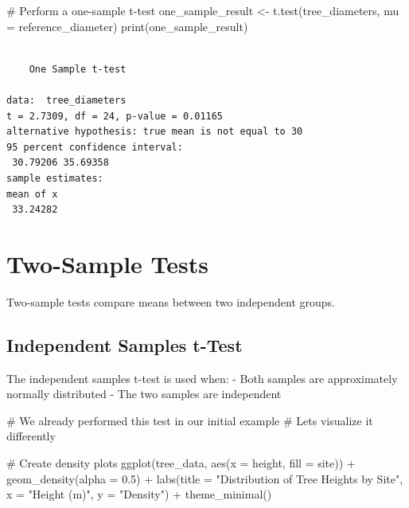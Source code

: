 \documentclass[
  letterpaper,
]{book}
\newenvironment{Shaded}{\begin{snugshade}}{\end{snugshade}}
\newcommand{\AttributeTok}[1]{\textcolor[rgb]{0.40,0.45,0.13}{#1}}
\newcommand{\CommentTok}[1]{\textcolor[rgb]{0.37,0.37,0.37}{#1}}
\newcommand{\FloatTok}[1]{\textcolor[rgb]{0.68,0.00,0.00}{#1}}
\newcommand{\FunctionTok}[1]{\textcolor[rgb]{0.28,0.35,0.67}{#1}}
\newcommand{\NormalTok}[1]{\textcolor[rgb]{0.00,0.23,0.31}{#1}}
\newcommand{\OtherTok}[1]{\textcolor[rgb]{0.00,0.23,0.31}{#1}}
\newcommand{\SpecialCharTok}[1]{\textcolor[rgb]{0.37,0.37,0.37}{#1}}
\newcommand{\StringTok}[1]{\textcolor[rgb]{0.13,0.47,0.30}{#1}}
\begin{document}
\begin{Shaded}
\begin{Highlighting}[]
\CommentTok{\# Perform a one{-}sample t{-}test}
\NormalTok{one\_sample\_result }\OtherTok{\textless{}{-}} \FunctionTok{t.test}\NormalTok{(tree\_diameters, }\AttributeTok{mu =}\NormalTok{ reference\_diameter)}
\FunctionTok{print}\NormalTok{(one\_sample\_result)}
\end{Highlighting}
\end{Shaded}

\begin{verbatim}

    One Sample t-test

data:  tree_diameters
t = 2.7309, df = 24, p-value = 0.01165
alternative hypothesis: true mean is not equal to 30
95 percent confidence interval:
 30.79206 35.69358
sample estimates:
mean of x 
 33.24282 
\end{verbatim}

\section{Two-Sample Tests}\label{two-sample-tests}

Two-sample tests compare means between two independent groups.

\subsection{Independent Samples
t-Test}\label{independent-samples-t-test}

The independent samples t-test is used when: - Both samples are
approximately normally distributed - The two samples are independent

\begin{Shaded}
\begin{Highlighting}[]
\CommentTok{\# We already performed this test in our initial example}
\CommentTok{\# Let\textquotesingle{}s visualize it differently}

\CommentTok{\# Create density plots}
\FunctionTok{ggplot}\NormalTok{(tree\_data, }\FunctionTok{aes}\NormalTok{(}\AttributeTok{x =}\NormalTok{ height, }\AttributeTok{fill =}\NormalTok{ site)) }\SpecialCharTok{+}
  \FunctionTok{geom\_density}\NormalTok{(}\AttributeTok{alpha =} \FloatTok{0.5}\NormalTok{) }\SpecialCharTok{+}
  \FunctionTok{labs}\NormalTok{(}\AttributeTok{title =} \StringTok{"Distribution of Tree Heights by Site"}\NormalTok{,}
       \AttributeTok{x =} \StringTok{"Height (m)"}\NormalTok{,}
       \AttributeTok{y =} \StringTok{"Density"}\NormalTok{) }\SpecialCharTok{+}
  \FunctionTok{theme\_minimal}\NormalTok{()}
\end{Highlighting}
\end{Shaded}
\end{document}
